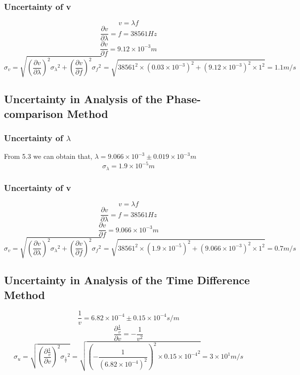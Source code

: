 \documentclass[12pt,a4paper]{article}
\begin{document}
\subsubsection{Uncertainty of v}
$$v=\lambda f$$
$$\frac{\partial v}{\partial \lambda}=f=38561Hz$$
$$\frac{\partial v}{\partial f}=9.12\times 10^{-3}m$$
$$\sigma_v=\sqrt{(\frac{\partial v}{\partial \lambda})^2{\sigma_\lambda}^2+(\frac{\partial v}{\partial f})^2{\sigma_f}^2}=\sqrt{38561^2\times(0.03\times10^{-3})^2+(9.12\times 10^{-3})^2\times 1^2}=1.1m/s$$

\subsection{Uncertainty in Analysis of the Phase-comparison Method}
\subsubsection{Uncertainty of $\lambda$}
From 5.3 we can obtain that, $\lambda=9.066\times 10^{-3}\pm 0.019\times 10^{-3}m$
$$\sigma_\lambda=1.9\times 10^{-5}m$$

\subsubsection{Uncertainty of v}
$$v=\lambda f$$
$$\frac{\partial v}{\partial \lambda}=f=38561Hz$$
$$\frac{\partial v}{\partial f}=9.066\times 10^{-3}m$$
$$\sigma_v=\sqrt{(\frac{\partial v}{\partial \lambda})^2{\sigma_\lambda}^2+(\frac{\partial v}{\partial f})^2{\sigma_f}^2}=\sqrt{38561^2\times(1.9\times10^{-5})^2+(9.066\times 10^{-3})^2\times 1^2}=0.7m/s$$

\subsection{Uncertainty in Analysis of the Time Difference Method}
$$\frac{1}{v}=6.82\times 10^{-4}\pm 0.15\times 10^{-4}s/m$$
$$\frac{\partial\frac{1}{v}}{\partial v}=-\frac{1}{v^2}$$
$$\sigma_u=\sqrt{(\frac{\partial\frac{1}{v}}{\partial v})^2{{\sigma_{\frac{1}{v}}}^2}}=\sqrt{(-\frac{1}{(6.82\times 10^{-4})^2})^2\times {0.15\times 10^{-4}}^2}=3\times 10^1m/s$$
\end{document}
